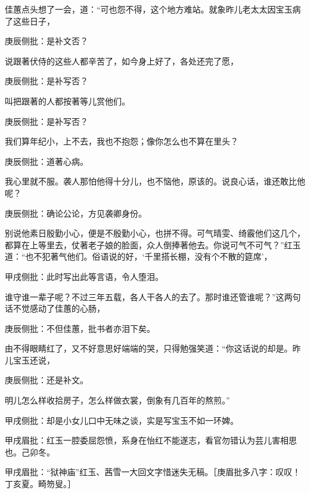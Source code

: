 \begin{parag}
    佳蕙点头想了一会，道：“可也怨不得，这个地方难站。就象昨儿老太太因宝玉病了这些日子，\begin{note}庚辰侧批：是补文否？\end{note}说跟著伏侍的这些人都辛苦了，如今身上好了，各处还完了愿，\begin{note}庚辰侧批：是补写否？\end{note}叫把跟著的人都按著等儿赏他们。\begin{note}庚辰侧批：是补写否？\end{note}我们算年纪小，上不去，我也不抱怨；像你怎么也不算在里头？\begin{note}庚辰侧批：道著心病。\end{note}我心里就不服。袭人那怕他得十分儿，也不恼他，原该的。说良心话，谁还敢比他呢？\begin{note}庚辰侧批：确论公论，方见袭卿身份。\end{note}别说他素日殷勤小心，便是不殷勤小心，也拼不得。可气晴雯、绮霰他们这几个，都算在上等里去，仗著老子娘的脸面，众人倒捧著他去。你说可气不可气？”红玉道：“也不犯著气他们。俗语说的好，‘千里搭长棚，没有个不散的筵席’，\begin{note}甲戌侧批：此时写出此等言语，令人堕泪。\end{note}谁守谁一辈子呢？不过三年五载，各人干各人的去了。那时谁还管谁呢？”这两句话不觉感动了佳蕙的心肠，\begin{note}庚辰侧批：不但佳蕙，批书者亦泪下矣。\end{note}由不得眼睛红了，又不好意思好端端的哭，只得勉强笑道：“你这话说的却是。昨儿宝玉还说，\begin{note}庚辰侧批：还是补文。\end{note}明儿怎么样收拾房子，怎么样做衣裳，倒象有几百年的熬煎。”\begin{note}甲戌侧批：却是小女儿口中无味之谈，实是写宝玉不如一环婢。\end{note}\begin{note}甲戌眉批：红玉一腔委屈怨愤，系身在怡红不能遂志，看官勿错认为芸儿害相思也。己卯冬。\end{note}\begin{note}甲戌眉批：“狱神庙”红玉、茜雪一大回文字惜迷失无稿。［庚眉批多八字：叹叹！丁亥夏。畸笏叟。］\end{note}
\end{parag}


